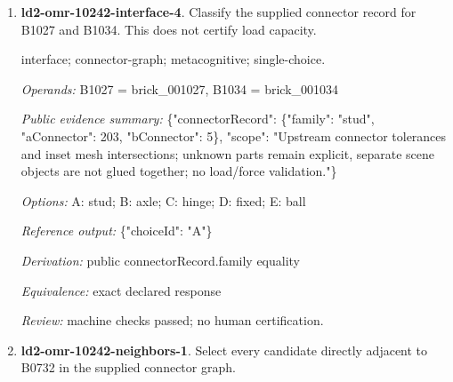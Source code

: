 \begin{enumerate}
\par{\small interface; connector-graph; metacognitive; single-choice.\par\textit{Operands:} B0578 = brick\_000578, B0981 = brick\_000981\par\textit{Public evidence summary:} \{"connectorRecord": \{"family": "hinge", "aConnector": 1, "bConnector": 2\}, "scope": "Upstream connector tolerances and inset mesh intersections; unknown parts remain explicit, separate scene objects are not glued together; no load/force validation."\}\par\textit{Options:} A: ball; B: fixed; C: hinge; D: axle; E: stud\par\textit{Reference output:} \{"choiceId": "C"\}\par\textit{Derivation:} public connectorRecord.family equality\par\textit{Equivalence:} exact declared response\par\textit{Review:} machine checks passed; no human certification.}
\item \textbf{ld2-omr-10242-interface-4}. Classify the supplied connector record for B1027 and B1034. This does not certify load capacity.
\par{\small interface; connector-graph; metacognitive; single-choice.\par\textit{Operands:} B1027 = brick\_001027, B1034 = brick\_001034\par\textit{Public evidence summary:} \{"connectorRecord": \{"family": "stud", "aConnector": 203, "bConnector": 5\}, "scope": "Upstream connector tolerances and inset mesh intersections; unknown parts remain explicit, separate scene objects are not glued together; no load/force validation."\}\par\textit{Options:} A: stud; B: axle; C: hinge; D: fixed; E: ball\par\textit{Reference output:} \{"choiceId": "A"\}\par\textit{Derivation:} public connectorRecord.family equality\par\textit{Equivalence:} exact declared response\par\textit{Review:} machine checks passed; no human certification.}
\item \textbf{ld2-omr-10242-neighbors-1}. Select every candidate directly adjacent to B0732 in the supplied connector graph.

\end{enumerate}
